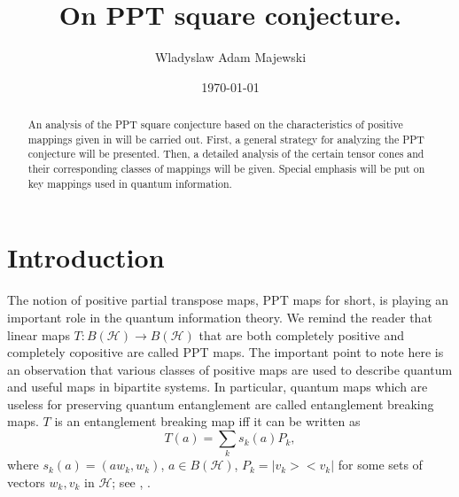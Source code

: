 \documentclass{amsart}
\theoremstyle{plain}
\theoremstyle{definition}
\newcommand{\cH}{\mathcal{H}}
\begin{document}
\title{On PPT square conjecture.} 

\author{Wladyslaw Adam Majewski}


\address{DSI-NRF CoE in Math. and Stat. Sci,\\ Focus Area for Pure and Applied Analytics,\\ Internal Box 209, School of Comp., Stat., $\&$ Math. Sci.\\NWU, PVT. BAG X6001, 2520 Potchefstroom\\ South Africa}



\date{\today}

\subjclass[2010]{}

\begin{abstract}
An analysis of the PPT square conjecture
based on the characteristics of positive mappings given in \cite{Maj} will be carried out.
First, a general strategy for analyzing the PPT conjecture will be presented. Then, a detailed analysis of the certain tensor cones and their corresponding classes of mappings will be given. Special emphasis will be put on key mappings used in quantum information.
\end{abstract}

\maketitle

\newpage
\section{Introduction}
The notion of positive partial transpose maps, PPT maps for short, is playing an important role in the quantum information theory. We remind the reader that linear maps $T: B(\cH) \to B(\cH)$  that are both completely positive and completely copositive are called PPT maps. 
The important point to note here is an observation  that  various classes of  positive maps are used to describe quantum and useful maps in bipartite systems. In particular, quantum maps which are useless for preserving quantum entanglement are called entanglement breaking maps. $T$ is an entanglement breaking map iff it can be written as
\begin{equation}
\label{super}
T(a) = \sum_k s_k(a) P_k,
\end{equation}
where $s_k(a) = (a w_k, w_k)$, $a \in B(\cH)$, $P_k = |v_k><v_k|$ for some sets of vectors $w_k, v_k$ in $\cH$; see \cite{HSR}, \cite{KMP}.
\end{document}

